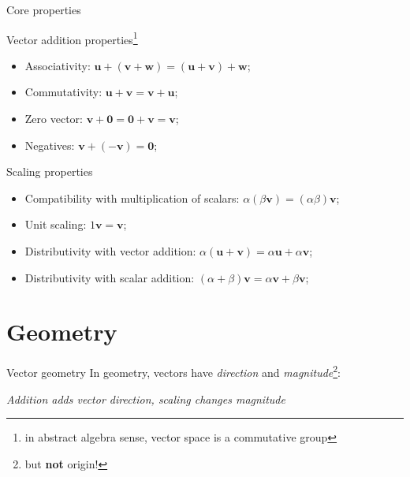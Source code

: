 \documentclass[10pt]{beamer}
\begin{document}
\begin{frame}{Core properties}
    \begin{block}{Vector addition properties\footnote{in abstract algebra sense, vector space is a commutative group}}
    \begin{itemize}
        \item Associativity: $\mathbf u + (\mathbf v + \mathbf w) = (\mathbf u + \mathbf v) + \mathbf w$;
        \item Commutativity: $\mathbf u + \mathbf v = \mathbf v + \mathbf u$;
        \item Zero vector: $\mathbf v + \mathbf 0 = \mathbf 0 + \mathbf v = \mathbf v$;
        \item Negatives: $\mathbf v + (-\mathbf v) = \mathbf 0$;
    \end{itemize}
    \end{block}
    \begin{block}{Scaling properties}
        \begin{itemize}
            \item Compatibility with multiplication of scalars: $\alpha (\beta \mathbf v) = (\alpha \beta) \mathbf v$;
            \item Unit scaling: $1 \mathbf v = \mathbf v$;
            \item Distributivity with vector addition: $\alpha (\mathbf u + \mathbf v) = \alpha \mathbf u + \alpha \mathbf v$;
            \item Distributivity with scalar addition: $(\alpha+\beta) \mathbf v = \alpha \mathbf v + \beta \mathbf v$;
        \end{itemize}
    \end{block}
\end{frame}

\section{Geometry}
\begin{frame}{Vector geometry}
    In geometry, vectors have \textit{direction} and \textit{magnitude}\footnote{but \textbf{not} origin!}:

    \begin{center}
        
        
        
        {\small{\textit{Addition adds vector direction, scaling changes magnitude}}}
    \end{center}
\end{frame}
\end{document}
